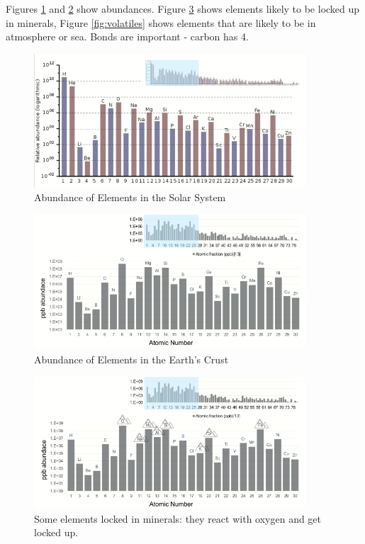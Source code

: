 \documentclass[]{article}
\begin{document}
Figures \ref{fig:abundances1} and \ref{fig:abundances2} show abundances. Figure \ref{fig:minerals} shows elements likely to be locked up in minerals, Figure \ref{fig:volatiles} shows elements that are likely to be in atmosphere or sea. Bonds are important - carbon has 4.

\begin{figure}[H]
	\caption{Abundance of Elements in the Solar System}\label{fig:abundances1} 
	\includegraphics[width=0.9\textwidth]{Abundances}
\end{figure}

\begin{figure}[H]
	\caption{Abundance of Elements in the Earth's Crust}\label{fig:abundances2}  
	\includegraphics[width=0.9\textwidth]{AbundancesEarth}
\end{figure}

\begin{figure}[H]
	\caption[Some elements locked in minerals]{Some elements locked in minerals: they react with oxygen and get locked up.}\label{fig:minerals} 
	\includegraphics[width=0.9\textwidth]{AbundancesMinerals}
\end{figure}
\end{document}
